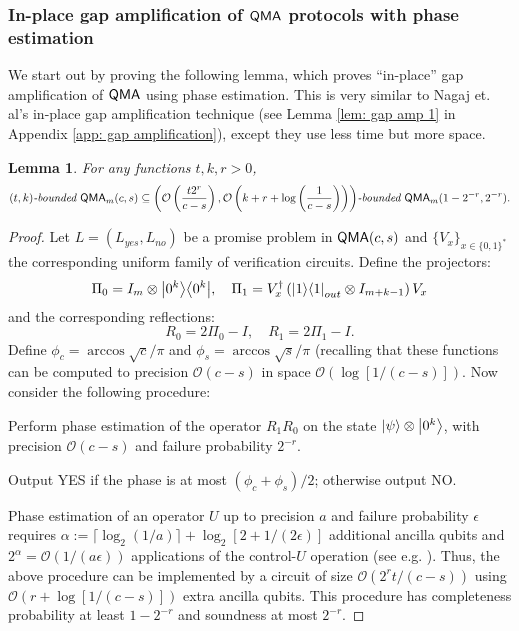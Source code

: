 \documentclass[11pt]{article}
\newtheorem{lemma}[theorem]{Lemma}
\theoremstyle{definition}
\theoremstyle{remark}
\newcommand\QMA{{\sf{QMA}}}
\newcommand\bddQMA[5]{{\left(#1,#2\right)}\textit{-bounded }\QMA_{#3}(#4,#5)}
\newcommand\bigoh{\mathcal{O}}
\begin{document}
\subsubsection {In-place gap amplification of $\QMA$ protocols with phase estimation}
We start out by proving the following lemma, which proves ``in-place'' gap amplification of $\QMA$ using phase estimation.
This is very similar to Nagaj et. al's in-place gap amplification technique \cite{nwz11} (see Lemma \ref{lem: gap amp 1} in Appendix \ref{app: gap amplification}), except they use less time but more space.
\begin{lemma} \label{lem: gap amp 2}
For any functions $t,k,r>0$, 
\[
\bddQMA{t}{k}{m}{c}{s}\subseteq\bddQMA{\mathcal{O}\left(\frac{t2^r}{c-s}\right)}{\mathcal{O}\left(k+r+\log\left(\frac{1}{c-s}\right)\right)}{m}{1-2^{-r}}{2^{-r}}.
\]
\end{lemma}
\begin{proof}
	Let $L=(L_{yes}, L_{no})$ be a promise problem in $\QMA(c,s)$ and $\{V_x\}_{x\in\{0,1\}^*}$ the corresponding uniform family of verification circuits.
Define the projectors:
\begin{equation}
\Pi_0 = I_m \otimes {\left\vert{0^k}\right\rangle}{\left\langle{0^k}\right\vert}, \quad \Pi_1 = V^\dagger_x \left({\left\vert{1}\right\rangle}{\left\langle{1}\right\vert}_{out} \otimes I_{m+k-1}\right) V_x
\end{equation}
and the corresponding reflections:
\begin{equation}
R_0 = 2\Pi_0 - I, \quad R_1 = 2\Pi_1 - I.
\end{equation}
Define $\phi_c = \arccos\sqrt{c}/\pi$ and $\phi_s = \arccos\sqrt{s}/\pi$ (recalling that these functions can be computed to precision $\bigoh (c-s)$ in space $\bigoh (\log[1/(c-s)])$. 
Now consider the following procedure:
\begin{compactenum}
\item Perform phase estimation of the operator $R_1R_0$ on the state ${\left\vert{\psi}\right\rangle}\otimes {\left\vert{0^k}\right\rangle}$, with precision $\bigoh (c-s)$ and failure probability $2^{-r}$.
\item Output YES if the phase is at most $(\phi_{c}+\phi_{s})/2$; otherwise output NO.
\end{compactenum}
Phase estimation of an operator $U$ up to precision $a$ and failure probability $\epsilon$ requires $\alpha := \lceil\log_2(1/a)\rceil + \log_2[2+1/(2\epsilon)]$ additional ancilla qubits and $2^\alpha = \mathcal{O}(1/(a\epsilon))$ applications of the control-$U$ operation (see e.g. \cite{nc00}).  Thus, the above procedure can be implemented by a circuit of size $\mathcal{O}(2^{r}t/(c-s))$ using $\mathcal{O}(r+\log[1/(c-s)])$ extra ancilla qubits. This procedure has completeness probability at least $1-2^{-r}$ and soundness at most $2^{-r}$.
\end{proof}
\end{document}
